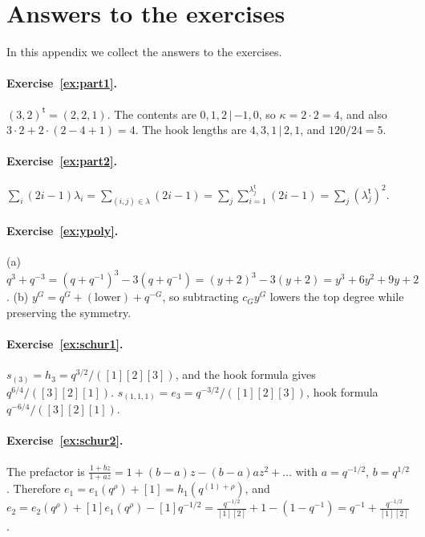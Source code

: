 \documentclass[11pt]{article}
\theoremstyle{plain}
\theoremstyle{definition}
\theoremstyle{remark}
\newcommand{\qrho}{q^{\rho}}
\newcommand{\qlr}[1]{q^{#1+\rho}}
\newcommand{\tr}{{\mathsf t}}
\newcommand{\lt}[1]{#1^{\tr}}
\begin{document}
\section{Answers to the exercises}\label{app:answers}

In this appendix we collect the answers to the exercises.


\paragraph{Exercise~\ref{ex:part1}.} $\lt{(3,2)}=(2,2,1)$. The contents are $0,1,2\,|\,{-1},0$,
so $\kappa=2\cdot2=4$, and also $3\cdot2+2\cdot(2-4+1)=4$. The hook lengths are
$4,3,1\,|\,2,1$, and $120/24=5$.

\paragraph{Exercise~\ref{ex:part2}.} $\sum_i(2i-1)\lambda_i=\sum_{(i,j)\in\lambda}(2i-1)
=\sum_j\sum_{i=1}^{\lt\lambda_j}(2i-1)=\sum_j(\lt\lambda_j)^2$.

\paragraph{Exercise~\ref{ex:ypoly}.} (a) $q^3+q^{-3}=(q+q^{-1})^3-3(q+q^{-1})=(y+2)^3-3(y+2)
=y^3+6y^2+9y+2$. (b) $y^G=q^G+(\text{lower})+q^{-G}$, so subtracting $c_Gy^G$ lowers the top degree
while preserving the symmetry.

\paragraph{Exercise~\ref{ex:schur1}.} $s_{(3)}=h_3=q^{3/2}/([1][2][3])$, and the hook formula
gives $q^{6/4}/([3][2][1])$. $s_{(1,1,1)}=e_3=q^{-3/2}/([1][2][3])$, hook formula
$q^{-6/4}/([3][2][1])$.

\paragraph{Exercise~\ref{ex:schur2}.} The prefactor is $\frac{1+bz}{1+az}=1+(b-a)z-(b-a)az^2+\ldots$
with $a=q^{-1/2}$, $b=q^{1/2}$. Therefore $e_1=e_1(\qrho)+[1]=h_1(\qlr{(1)})$, and
$e_2=e_2(\qrho)+[1]e_1(\qrho)-[1]q^{-1/2}=\frac{q^{-1/2}}{[1][2]}+1-(1-q^{-1})=q^{-1}+\frac{q^{-1/2}}{[1][2]}$.
\end{document}
